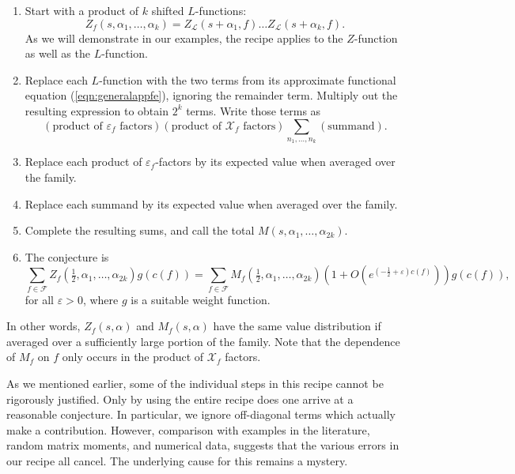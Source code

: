 \documentclass[12pt,letterpaper]{amsart}
\theoremstyle{plain}
\theoremstyle{definition}
\theoremstyle{remark}
\numberwithin{equation}{subsection}
\numberwithin{theorem}{subsection}
\numberwithin{table}{subsection}
\begin{document}
\begin{enumerate}
\item{} Start with a product of $k$ shifted $L$-functions:
\begin{equation}
Z_f(s,\alpha_1,\dots,\alpha_{k}) =
Z_\mathcal{L}(s +\alpha_1,f)\dots
Z_\mathcal{L}(s +\alpha_k,f).
\end{equation}
As we will demonstrate in our examples, the recipe applies to
the $Z$-function as well as the $L$-function.

\item{} Replace each $L$-function with the two terms from its
approximate functional equation (\ref{eqn:generalappfe}), ignoring the remainder term.
Multiply out the resulting
expression to obtain $2^{k}$ terms.  Write those terms as
\begin{equation}
(\text{product of $\varepsilon_f$ factors})
(\text{product of $\mathcal{X}_f$ factors})
\sum_{n_1,\dots,n_k} (\text{summand}) .
\end{equation}

\item{} Replace each product of $\varepsilon_f$-factors 
by its expected value when averaged over the family.

\item{} Replace each summand by its expected value when averaged over the family.

\item{} Complete the resulting sums, and call the total
$M(s,\alpha_1,\dots,\alpha_{2k})$.

\item{} The conjecture is
\begin{equation}
\sum_{f\in \mathcal F} Z_f(\tfrac12,\alpha_1,\dots,\alpha_{2k}) g(c(f))
=
\sum_{f\in \mathcal F} M_f(\tfrac12,\alpha_1,\dots,\alpha_{2k})
(1+O(e^{(-\frac12 + \varepsilon)c(f)})) g(c(f)),
\end{equation}
for all $\varepsilon>0$, where $g$ is a suitable weight function.
\end{enumerate}

In other words, $Z_f(s,\alpha)$ and $M_f(s,\alpha)$ have the same value
distribution if averaged over a sufficiently large portion of the family.
Note that the dependence of $M_f$ on $f$ only occurs in the product
of $\mathcal{X}_f$ factors.

As we mentioned earlier, some of the individual steps in this 
recipe cannot be rigorously justified.  Only by using the entire
recipe does one arrive at a reasonable conjecture.  In particular,
we ignore off-diagonal terms which actually
make a contribution.  However, comparison with examples in the literature,
random matrix moments, and
numerical data, suggests that the various errors in our recipe all
cancel.  The underlying cause for this remains a mystery.
\end{document}
